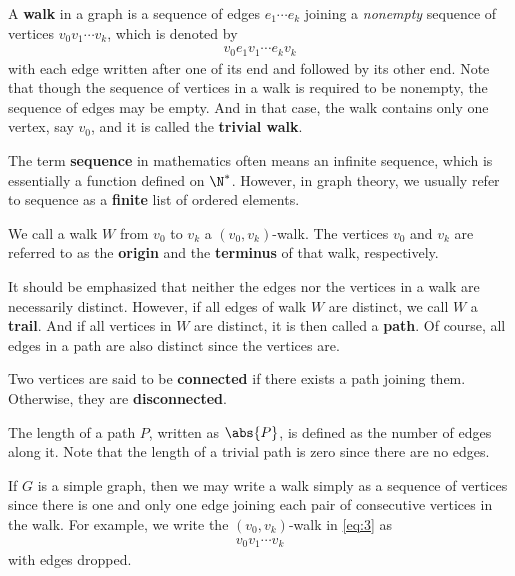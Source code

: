 \documentclass[thmcnt=section, 12pt, color=cyan]{my-elegantbook}
\begin{document}
A \textbf{walk} in a graph is a sequence of edges $e_1 \cdots e_k$ joining a \textit{nonempty} sequence of vertices $v_0 v_1 \cdots v_k$, which is denoted by 
\begin{align}
    v_0 e_1 v_1 \cdots e_k v_k 
    \label{eq:3}
\end{align}
with each edge written after one of its end and followed by its other end. Note that though the sequence of vertices in a walk is required to be nonempty, the sequence of edges may be empty. And in that case, the walk contains only one vertex, say $v_0$, and it is called the \textbf{trivial walk}.
\begin{note}
    The term \textbf{sequence} in mathematics often means an infinite sequence, which is essentially a function defined on $\N^\ast$. However, in graph theory, we usually refer to sequence as a \textbf{finite} list of ordered elements.
\end{note}

We call a walk $W$ from $v_0$ to $v_k$ a $(v_0, v_k)$-walk. The vertices $v_0$ and $v_k$ are referred to as the \textbf{origin} and the \textbf{terminus} of that walk, respectively. 

It should be emphasized that neither the edges nor the vertices in a walk are necessarily distinct. However, if all edges of walk $W$ are distinct, we call $W$ a \textbf{trail}. And if all vertices in $W$ are distinct, it is then called a \textbf{path}. Of course, all edges in a path are also distinct since the vertices are.

Two vertices are said to be \textbf{connected} if there exists a path joining them. Otherwise, they are \textbf{disconnected}. 

The length of a path $P$, written as $\abs{P}$, is defined as the number of edges along it. Note that the length of a trivial path is zero since there are no edges.

If $G$ is a simple graph, then we may write a walk simply as a sequence of vertices since there is one and only one edge joining each pair of consecutive vertices in the walk. For example, we write the $(v_0, v_k)$-walk in \eqref{eq:3} as 
\begin{align*}
    v_0 v_1 \cdots v_k
\end{align*}
with edges dropped.

\end{document}
